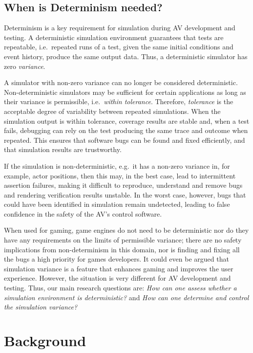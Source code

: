 \subsection{When is Determinism needed?}
Determinism is a key requirement for simulation during AV development and testing. A deterministic simulation environment guarantees that tests are repeatable, i.e.\ repeated runs of a test, given the same initial conditions and event history, produce the same output data. Thus, a deterministic simulator has zero \textit{variance}. 

A simulator with non-zero variance can no longer be considered deterministic. Non-deterministic simulators may be sufficient for certain applications as long as their variance is permissible, i.e.\ \textit{within tolerance}. Therefore, \textit{tolerance} is the acceptable degree of variability between repeated simulations. When the simulation output is within tolerance, coverage results are stable and, when a test fails, debugging can rely on the test producing the same trace and outcome when repeated. This ensures that software bugs can be found and fixed efficiently, and that simulation results are trustworthy.

If the simulation is non-deterministic, e.g.\ it has a non-zero variance in, for example, actor positions, then this may, in the best case, lead to intermittent assertion failures, making it difficult to reproduce, understand and remove bugs and rendering verification results unstable. In the worst case, however, bugs that could have been identified in simulation remain undetected, leading to false confidence in the safety of the AV's control software. 

When used for gaming, game engines do not need to be deterministic nor do they have any requirements on the limits of permissible variance; there are no safety implications from non-determinism in this domain, nor is finding and fixing all the bugs a high priority for games developers. It could even be argued that simulation variance is a feature that enhances gaming and improves the user experience. However, the situation is very different for AV development and testing. Thus, our main research questions are:
{\em How can one assess whether a simulation environment is deterministic?} and 
{\em How can one determine and control the simulation variance?}


\section{Background} \label{s:background}

